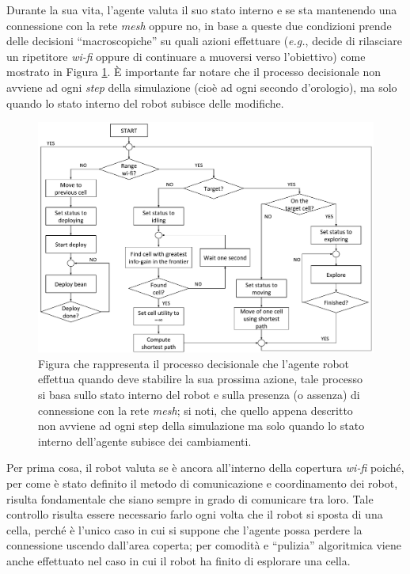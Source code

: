 Durante la sua vita, l'agente valuta il suo stato interno e se sta mantenendo una connessione con la rete \textit{mesh} oppure no, in base a queste due condizioni prende delle decisioni “macroscopiche” su quali azioni effettuare (\textit{e.g.}, decide di rilasciare un ripetitore \textit{wi-fi} oppure di continuare a muoversi verso l'obiettivo) come mostrato in Figura \ref{fig:robotworkflow}.
È importante far notare che il processo decisionale non avviene ad ogni \textit{step} della simulazione (cioè ad ogni secondo d'orologio), ma solo quando lo stato interno del robot subisce delle modifiche.
\begin{figure}
	\centering
	\includegraphics[width=1.0\linewidth]{images/Robot_workflow}
	\caption{Figura che rappresenta il processo decisionale che l'agente robot effettua quando deve stabilire la sua prossima azione, tale processo si basa sullo stato interno del robot e sulla presenza (o assenza) di connessione con la rete \textit{mesh}; si noti, che quello appena descritto non avviene ad ogni step della simulazione ma solo quando lo stato interno dell'agente subisce dei cambiamenti.}
	\label{fig:robotworkflow}
\end{figure}
Per prima cosa, il robot valuta se è ancora all'interno della copertura \textit{wi-fi} poiché, per come è stato definito il metodo di comunicazione e coordinamento dei robot, risulta fondamentale che siano sempre in grado di comunicare tra loro.
Tale controllo risulta essere necessario farlo ogni volta che il robot si sposta di una cella, perché è l'unico caso in cui si suppone che l'agente possa perdere la connessione uscendo dall'area coperta; per comodità e “pulizia” algoritmica viene anche effettuato nel caso in cui il robot ha finito di esplorare una cella.
